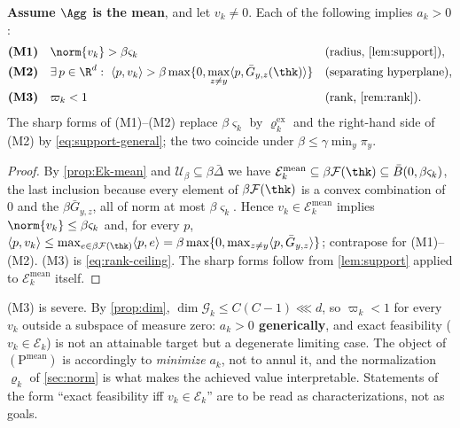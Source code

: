 \begin{proposition}
\label{prop:certificates-mean}
\textbf{Assume $\Agg$ is the mean}, and let $v_k\neq0$. Each of the following implies $a_k>0$:
\begin{align}
\textbf{(M1)}\quad&\norm{v_k}>\beta\varsigma_k
&&\text{(radius, \cref{lem:support})},\\
\textbf{(M2)}\quad&\exists\,p\in\R^d:\ \langle p,v_k\rangle>\beta\max\{0,\max_{z\neq y}\langle p,\bar G_{y,z}(\thk)\rangle\}
&&\text{(separating hyperplane)},\\
\textbf{(M3)}\quad&\varpi_k<1
&&\text{(rank, \cref{rem:rank})}.
\end{align}
The sharp forms of (M1)--(M2) replace $\beta\varsigma_k$ by $\varrho^{\mathrm{ex}}_k$ and the
right-hand side of (M2) by \cref{eq:support-general}; the two coincide under
$\beta\le\gamma\min_y\pi_y$.
\end{proposition}
\begin{proof}
By \cref{prop:Ek-mean} and $\mathcal{U}_\beta\subseteq\beta\bar\Delta$ we have
$\mathcal{E}_k^{\mathrm{mean}}\subseteq\beta\mathcal{F}(\thk)\subseteq\bar B(0,\beta\varsigma_k)$,
the last inclusion because every element of $\beta\mathcal{F}(\thk)$ is a convex combination of
$0$ and the $\beta\bar G_{y,z}$, all of norm at most $\beta\varsigma_k$. Hence
$v_k\in\mathcal{E}_k^{\mathrm{mean}}$ implies $\norm{v_k}\le\beta\varsigma_k$ and, for every $p$,
$\langle p,v_k\rangle\le\max_{e\in\beta\mathcal{F}(\thk)}\langle p,e\rangle
=\beta\max\{0,\max_{z\neq y}\langle p,\bar G_{y,z}\rangle\}$; contrapose for (M1)--(M2). (M3) is
\cref{eq:rank-ceiling}. The sharp forms follow from \cref{lem:support} applied to
$\mathcal{E}_k^{\mathrm{mean}}$ itself.
\end{proof}

\begin{remark}
\label{rem:generic-infeasible}
(M3) is severe. By \cref{prop:dim}, $\dim\mathcal{G}_k\le C(C-1)\lll d$, so $\varpi_k<1$ for every $v_k$ outside a subspace of measure zero: \textbf{$a_k>0$ generically}, and exact feasibility ($v_k\in\mathcal{E}_k$) is not an attainable target but a degenerate limiting case. The object of $(\mathrm{P}^{\mathrm{mean}})$ is accordingly to \emph{minimize} $a_k$, not to annul it, and the normalization $\varrho_k$ of \cref{sec:norm} is what makes the achieved value interpretable. Statements of the form ``exact feasibility iff $v_k\in\mathcal{E}_k$'' are to be read as characterizations, not as goals.
\end{remark}

